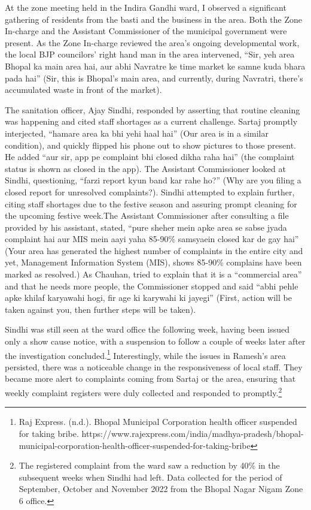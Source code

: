 At the zone meeting held in the Indira Gandhi ward, I observed a significant gathering of residents from the basti and the business in the area. Both the Zone In-charge and the Assistant Commissioner of the municipal government were present. As the Zone In-charge reviewed the area's ongoing developmental work, the local BJP councilors' right hand man in the area intervened, ``Sir, yeh area Bhopal ka main area hai, aur abhi Navratre ke time market ke samne kuda bhara pada hai'' (Sir, this is Bhopal's main area, and currently, during Navratri, there's accumulated waste in front of the market).

The sanitation officer, Ajay Sindhi, responded by asserting that routine cleaning was happening and cited staff shortages as a current challenge. Sartaj promptly interjected, ``hamare area ka bhi yehi haal hai'' (Our area is in a similar condition), and quickly flipped his phone out to show pictures to those present. He added ``aur sir, app pe complaint bhi closed dikha raha hai'' (the complaint status is shown as closed in the app). The Assistant Commissioner looked at Sindhi, questioning, ``farzi report kyun band kar rahe ho?'' (Why are you filing a closed report for unresolved complaints?). Sindhi attempted to explain further, citing staff shortages due to the festive season and assuring prompt cleaning for the upcoming festive week.The Assistant Commissioner after consulting a file provided by his assistant, stated, ``pure sheher mein apke area se sabse jyada complaint hai aur MIS mein aayi yaha 85-90\% samsyaein closed kar de gay hai'' (Your area has generated the highest number of complaints in the entire city and yet, Management Information System (MIS), shows 85-90\% complains have been marked as resolved.) As Chauhan, tried to explain that it is a ``commercial area'' and that he needs more people, the Commissioner stopped and said ``abhi pehle apke khilaf karyawahi hogi, fir age ki karywahi ki jayegi'' (First, action will be taken against you, then further steps will be taken).

Sindhi was still seen at the ward office the following week, having been issued only a show cause notice, with a suspension to follow a couple of weeks later after the investigation concluded.\footnote{Raj Express. (n.d.). Bhopal Municipal Corporation health officer suspended for taking bribe. https://www.rajexpress.com/india/madhya-pradesh/bhopal-municipal-corporation-health-officer-suspended-for-taking-bribe} Interestingly, while the issues in Ramesh's area persisted, there was a noticeable change in the responsiveness of local staff. They became more alert to complaints coming from Sartaj or the area, ensuring that weekly complaint registers were duly collected and responded to promptly.\footnote{The registered complaint from the ward saw a reduction by 40\% in the subsequent weeks when Sindhi had left. Data collected for the period of September, October and November 2022 from the Bhopal Nagar Nigam Zone 6 office.}

